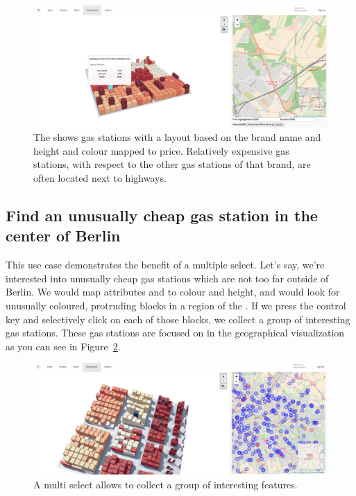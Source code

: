 \begin{figure}[h]
  \centering
  \includegraphics[width=\textwidth]{figures/evaluation/cases/gasstations}
  \caption{
    The \tmap{} shows gas stations with a layout based on the brand name and height and colour mapped to price.
    Relatively expensive gas stations, with respect to the other gas stations of that brand, are often located next to highways.
  }\label{fig:evaluation:cases:gasstations}
\end{figure}

\subsection{Find an unusually cheap gas station in the center of Berlin}

This use case demonstrates the benefit of a multiple select.
Let's say, we're interested into unusually cheap gas stations which are not too far outside of Berlin.
We would map attributes  and  to colour and height, and would look for unusually coloured, protruding blocks in a region of the \tmap{}.
If we press the control key and selectively click on each of those blocks, we collect a group of interesting gas stations.
These gas stations are focused on in the geographical visualization as you can see in Figure~\ref{fig:evaluation:cases:gasstations_multiselect}.

\begin{figure}[h]
  \centering
  \includegraphics[width=\textwidth]{figures/evaluation/cases/gasstations_multiselect}
  \caption{
    A multi select allows to collect a group of interesting features.
  }\label{fig:evaluation:cases:gasstations_multiselect}
\end{figure}



